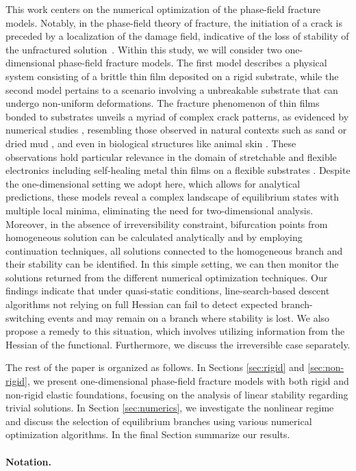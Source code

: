 This work centers on the numerical optimization of the  phase-field fracture models.  Notably, in the phase-field theory of fracture, the initiation of a crack is preceded by a localization of the damage field, indicative of the loss of stability of the unfractured solution~\cite{Baldelli2014-ho,Kuhn2015-rt,Baldelli2021-gc,Harandi2023-cd}. Within this study, we will consider two one-dimensional phase-field  fracture models. The first model describes a physical system consisting of a brittle thin film deposited on a rigid substrate,  while the second model pertains to a scenario involving a  unbreakable substrate that can undergo non-uniform deformations.  The fracture phenomenon of thin films bonded to substrates unveils a myriad of complex crack patterns, as evidenced by numerical studies \cite{Baldelli2014-ho,Alessi2019-bx,Hu2020-nt,Salman2021-mn,Baldelli2021-gc}, resembling those observed in natural contexts such as sand or dried mud \cite{Goehring2010-xz}, and even in biological structures like animal skin \cite{Qin2014-wz}. These observations hold particular relevance in the domain of stretchable and flexible electronics \cite{Faurie2019-to,Godard2022-ss} including  self-healing metal thin films on a flexible substrates \cite{Trost2024-ca}.  Despite the one-dimensional setting we adopt here, which allows for analytical predictions, these models reveal a complex landscape of equilibrium states with multiple local minima, eliminating the need for two-dimensional analysis. Moreover, in the absence of irreversibility constraint, bifurcation points from homogeneous solution can be calculated analytically and by employing continuation techniques, all solutions connected to the homogeneous branch and their stability can be identified. 
In this simple setting, we can then monitor the solutions returned from  the different  numerical optimization techniques. Our findings indicate that under quasi-static conditions, line-search-based descent algorithms not relying on full Hessian can fail to detect expected branch-switching events and may remain on a branch where stability is lost. 
We also propose a remedy to this situation, which involves utilizing information from the Hessian of the functional. Furthermore, we discuss the irreversible case separately.

The rest of the paper is organized as follows. In Sections \ref{sec:rigid} and \ref{sec:non-rigid}, we present one-dimensional phase-field fracture models with both rigid and non-rigid elastic foundations, focusing on the analysis  of linear stability regarding trivial solutions. In Section \ref{sec:numerics}, we investigate the nonlinear regime and discuss the selection of equilibrium branches using various numerical optimization algorithms. In the final Section  summarize our results.

\paragraph{Notation.} 